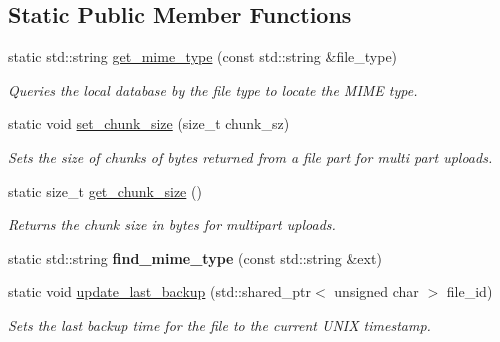 \subsection*{Static Public Member Functions}
\begin{DoxyCompactItemize}
\item 
static std\+::string \hyperlink{class_vessel_1_1_file_1_1_backup_file_aad30aceff344be7bc06f632e98303ac9}{get\+\_\+mime\+\_\+type} (const std\+::string \&file\+\_\+type)
\begin{DoxyCompactList}\small\item\em Queries the local database by the file type to locate the M\+I\+ME type. \end{DoxyCompactList}\item 
\mbox{\label{class_vessel_1_1_file_1_1_backup_file_a994e23eb96c22a0200a3d23fa076f70e}} 
static void \hyperlink{class_vessel_1_1_file_1_1_backup_file_a994e23eb96c22a0200a3d23fa076f70e}{set\+\_\+chunk\+\_\+size} (size\+\_\+t chunk\+\_\+sz)
\begin{DoxyCompactList}\small\item\em Sets the size of chunks of bytes returned from a file part for multi part uploads. \end{DoxyCompactList}\item 
\mbox{\label{class_vessel_1_1_file_1_1_backup_file_afcb9ec4a98b6d3e6fdb80df2b10e893b}} 
static size\+\_\+t \hyperlink{class_vessel_1_1_file_1_1_backup_file_afcb9ec4a98b6d3e6fdb80df2b10e893b}{get\+\_\+chunk\+\_\+size} ()
\begin{DoxyCompactList}\small\item\em Returns the chunk size in bytes for multipart uploads. \end{DoxyCompactList}\item 
\mbox{\label{class_vessel_1_1_file_1_1_backup_file_a8035a850faea49c0216c499bae5160d0}} 
static std\+::string {\bfseries find\+\_\+mime\+\_\+type} (const std\+::string \&ext)
\item 
\mbox{\label{class_vessel_1_1_file_1_1_backup_file_a6c70e380298c462c9f7e36600e63ee8f}} 
static void \hyperlink{class_vessel_1_1_file_1_1_backup_file_a6c70e380298c462c9f7e36600e63ee8f}{update\+\_\+last\+\_\+backup} (std\+::shared\+\_\+ptr$<$ unsigned char $>$ file\+\_\+id)
\begin{DoxyCompactList}\small\item\em Sets the last backup time for the file to the current U\+N\+IX timestamp. \end{DoxyCompactList}\end{DoxyCompactItemize}


